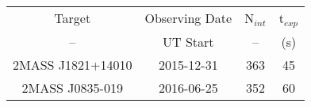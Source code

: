 \begin{table}
\begin{tabular}{cccc}
Target & Observing Date & N$_{int}$ & t$_{exp}$ \\
-- & UT Start & -- & (s) \\
2MASS J1821+14010 & 2015-12-31 & 363 & 45 \\
2MASS J0835-019 & 2016-06-25 & 352 & 60 \\
\end{tabular}
\end{table}
